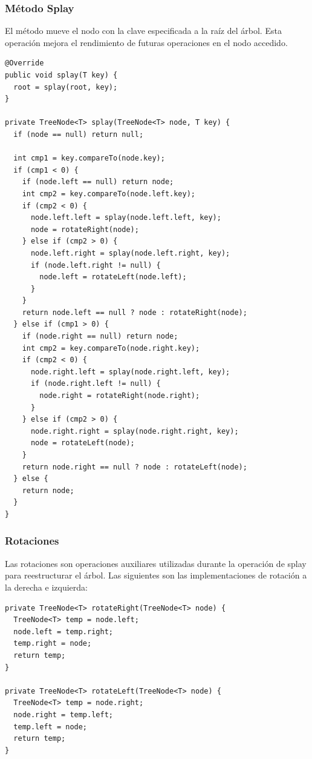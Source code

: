 \subsubsection{Método Splay}
El método  mueve el nodo con la clave especificada a la raíz del árbol. Esta operación mejora el rendimiento de futuras operaciones en el nodo accedido.
\begin{verbatim}
@Override
public void splay(T key) {
  root = splay(root, key);
}

private TreeNode<T> splay(TreeNode<T> node, T key) {
  if (node == null) return null;

  int cmp1 = key.compareTo(node.key);
  if (cmp1 < 0) {
    if (node.left == null) return node;
    int cmp2 = key.compareTo(node.left.key);
    if (cmp2 < 0) {
      node.left.left = splay(node.left.left, key);
      node = rotateRight(node);
    } else if (cmp2 > 0) {
      node.left.right = splay(node.left.right, key);
      if (node.left.right != null) {
        node.left = rotateLeft(node.left);
      }
    }
    return node.left == null ? node : rotateRight(node);
  } else if (cmp1 > 0) {
    if (node.right == null) return node;
    int cmp2 = key.compareTo(node.right.key);
    if (cmp2 < 0) {
      node.right.left = splay(node.right.left, key);
      if (node.right.left != null) {
        node.right = rotateRight(node.right);
      }
    } else if (cmp2 > 0) {
      node.right.right = splay(node.right.right, key);
      node = rotateLeft(node);
    }
    return node.right == null ? node : rotateLeft(node);
  } else {
    return node;
  }
}
\end{verbatim}

\subsubsection{Rotaciones}
Las rotaciones son operaciones auxiliares utilizadas durante la operación de splay para reestructurar el árbol. Las siguientes son las implementaciones de rotación a la derecha e izquierda:
\begin{verbatim}
private TreeNode<T> rotateRight(TreeNode<T> node) {
  TreeNode<T> temp = node.left;
  node.left = temp.right;
  temp.right = node;
  return temp;
}

private TreeNode<T> rotateLeft(TreeNode<T> node) {
  TreeNode<T> temp = node.right;
  node.right = temp.left;
  temp.left = node;
  return temp;
}
\end{verbatim}

